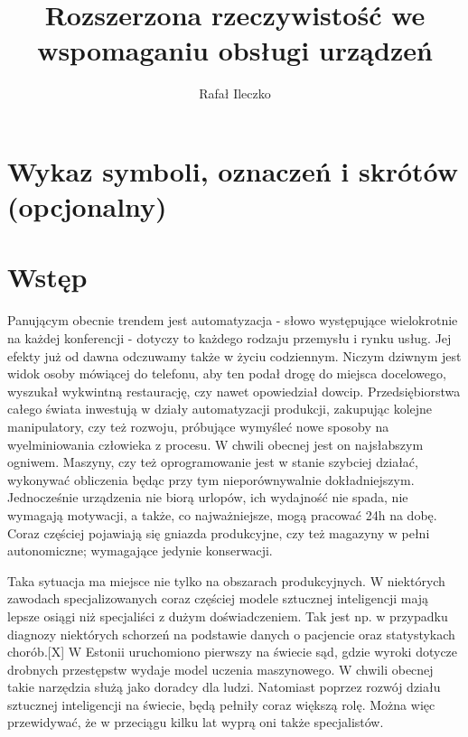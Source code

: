 \documentclass[12pt,twoside]{article}
\author{Rafał Ileczko}
\title{Rozszerzona rzeczywistość we wspomaganiu obsługi urządzeń}
\begin{document}
\maketitle

\blankpage

\tableofcontents

\clearpage
\blankpage


\section*{Wykaz symboli, oznaczeń i skrótów (opcjonalny)}
%
\clearpage


\section{Wstęp}

Panującym obecnie trendem jest automatyzacja - słowo występujące wielokrotnie na każdej konferencji - dotyczy to każdego rodzaju przemysłu i rynku usług. Jej efekty już od dawna odczuwamy także w życiu codziennym. Niczym dziwnym jest widok osoby mówiącej do telefonu, aby ten podał drogę do miejsca docelowego, wyszukał wykwintną restaurację, czy nawet opowiedział dowcip. Przedsiębiorstwa całego świata inwestują w działy automatyzacji produkcji, zakupując kolejne manipulatory, czy też rozwoju, próbujące wymyśleć nowe sposoby na wyelminiowania człowieka z procesu. W chwili obecnej jest on najsłabszym ogniwem. Maszyny, czy też oprogramowanie jest w stanie szybciej działać, wykonywać obliczenia będąc przy tym nieporównywalnie dokładniejszym. Jednocześnie urządzenia nie biorą urlopów, ich wydajność nie spada, nie wymagają motywacji, a także, co najważniejsze, mogą pracować 24h na dobę. Coraz częściej pojawiają się gniazda produkcyjne, czy też magazyny w pełni autonomiczne; wymagające jedynie konserwacji.

Taka sytuacja ma miejsce nie tylko na obszarach produkcyjnych. W niektórych zawodach specjalizowanych coraz częściej modele sztucznej inteligencji mają lepsze osiągi niż specjaliści z dużym doświadczeniem. Tak jest np. w przypadku diagnozy niektórych schorzeń na podstawie danych o pacjencie oraz statystykach chorób.[X] W Estonii uruchomiono pierwszy na świecie sąd, gdzie wyroki dotycze drobnych przestępstw wydaje model uczenia maszynowego. W chwili obecnej takie narzędzia służą jako doradcy dla ludzi. Natomiast poprzez rozwój działu sztucznej inteligencji na świecie, będą pełniły coraz większą rolę. Można więc przewidywać, że w przeciągu kilku lat wyprą oni także specjalistów.
\end{document}
